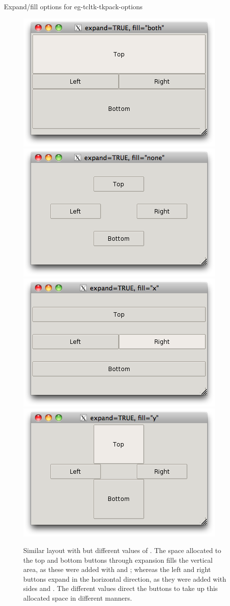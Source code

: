 \begin{example}{Expand/fill options for }{eg-tcltk-tkpack-options}
%
\begin{figure}
  \centering
\includegraphics[width=.4\textwidth]{fig-tcltk-expand-fill-both.png}
\includegraphics[width=.4\textwidth]{fig-tcltk-expand-fill-none.png}\\
\includegraphics[width=.4\textwidth]{fig-tcltk-expand-fill-x.png}
\includegraphics[width=.4\textwidth]{fig-tcltk-expand-fill-y.png}
 \caption{Similar layout with  but different values
   of . The space allocated to the  top and bottom buttons
   through expansion fills the vertical area, as these were added with
    and ; whereas the left and
   right buttons expand in the horizontal direction, as they were
   added with sides  and . The different
    values direct the buttons to take up this allocated
   space in different manners.}
 \label{fig:tcltk-expand-fill-arguments}
\end{figure}

\end{example}
